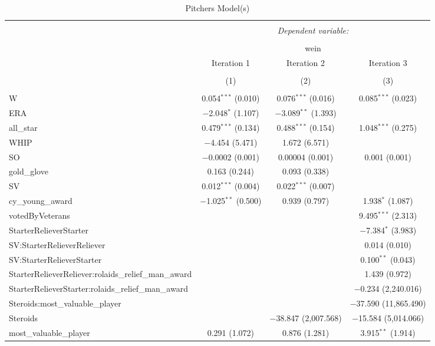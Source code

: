 \documentclass[
]{article}
\begin{document}
\begin{table}[H] \centering 
  \caption{Pitchers Model(s)} 
  \label{} 
\tiny 
\begin{tabular}{@{\extracolsep{5pt}}lccc} 
\\[-1.8ex]\hline 
\hline \\[-1.8ex] 
 & \multicolumn{3}{c}{\textit{Dependent variable:}} \\ 
\cline{2-4} 
\\[-1.8ex] & \multicolumn{3}{c}{wein} \\ 
 & Iteration 1 & Iteration 2 & Iteration 3 \\ 
\\[-1.8ex] & (1) & (2) & (3)\\ 
\hline \\[-1.8ex] 
 W & 0.054$^{***}$ (0.010) & 0.076$^{***}$ (0.016) & 0.085$^{***}$ (0.023) \\ 
  ERA & $-$2.048$^{*}$ (1.107) & $-$3.089$^{**}$ (1.393) &  \\ 
  all\_star & 0.479$^{***}$ (0.134) & 0.488$^{***}$ (0.154) & 1.048$^{***}$ (0.275) \\ 
  WHIP & $-$4.454 (5.471) & 1.672 (6.571) &  \\ 
  SO & $-$0.0002 (0.001) & 0.00004 (0.001) & 0.001 (0.001) \\ 
  gold\_glove & 0.163 (0.244) & 0.093 (0.338) &  \\ 
  SV & 0.012$^{***}$ (0.004) & 0.022$^{***}$ (0.007) &  \\ 
  cy\_young\_award & $-$1.025$^{**}$ (0.500) & 0.939 (0.797) & 1.938$^{*}$ (1.087) \\ 
  votedByVeterans &  &  & 9.495$^{***}$ (2.313) \\ 
  StarterRelieverStarter &  &  & $-$7.384$^{*}$ (3.983) \\ 
  SV:StarterRelieverReliever &  &  & 0.014 (0.010) \\ 
  SV:StarterRelieverStarter &  &  & 0.100$^{**}$ (0.043) \\ 
  StarterRelieverReliever:rolaids\_relief\_man\_award &  &  & 1.439 (0.972) \\ 
  StarterRelieverStarter:rolaids\_relief\_man\_award &  &  & $-$0.234 (2,240.016) \\ 
  Steroids:most\_valuable\_player &  &  & $-$37.590 (11,865.490) \\ 
  Steroids &  & $-$38.847 (2,007.568) & $-$15.584 (5,014.066) \\ 
  most\_valuable\_player & 0.291 (1.072) & 0.876 (1.281) & 3.915$^{**}$ (1.914) \\ 

\end{tabular}
\end{table}
\end{document}
